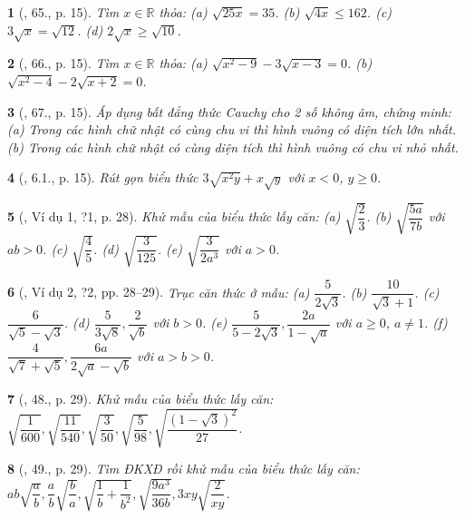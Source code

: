 \documentclass{article}
\newtheorem{baitoan}{}
\begin{document}
\begin{baitoan}[\cite{SBT_Toan_9_tap_1}, 65., p. 15]
	Tìm $x\in\mathbb{R}$ thỏa: (a) $\sqrt{25x} = 35$. (b) $\sqrt{4x}\le162$. (c) $3\sqrt{x} = \sqrt{12}$. (d) $2\sqrt{x}\ge\sqrt{10}$.
\end{baitoan}

\begin{baitoan}[\cite{SBT_Toan_9_tap_1}, 66., p. 15]
	Tìm $x\in\mathbb{R}$ thỏa: (a) $\sqrt{x^2 - 9} - 3\sqrt{x - 3} = 0$. (b) $\sqrt{x^2 - 4} - 2\sqrt{x + 2} = 0$.
\end{baitoan}

\begin{baitoan}[\cite{SBT_Toan_9_tap_1}, 67., p. 15]
	Áp dụng bất đẳng thức Cauchy cho 2 số không âm, chứng minh: (a) Trong các hình chữ nhật có cùng chu vi thì hình vuông có diện tích lớn nhất. (b) Trong các hình chữ nhật có cùng diện tích thì hình vuông có chu vi nhỏ nhất.
\end{baitoan}

\begin{baitoan}[\cite{SBT_Toan_9_tap_1}, 6.1., p. 15]
	Rút gọn biểu thức $3\sqrt{x^2y} + x\sqrt{y}$ với $x < 0$, $y\ge0$.
\end{baitoan}

\begin{baitoan}[\cite{SGK_Toan_9_tap_1}, Ví dụ 1, ?1, p. 28]
	Khử mẫu của biểu thức lấy căn: (a) $\sqrt{\dfrac{2}{3}}$. (b) $\sqrt{\dfrac{5a}{7b}}$ với $ab > 0$. (c) $\sqrt{\dfrac{4}{5}}$. (d) $\sqrt{\dfrac{3}{125}}$. (e) $\sqrt{\dfrac{3}{2a^3}}$ với $a > 0$.
\end{baitoan}

\begin{baitoan}[\cite{SGK_Toan_9_tap_1}, Ví dụ 2, ?2, pp. 28--29]
	Trục căn thức ở mẫu: (a) $\dfrac{5}{2\sqrt{3}}$. (b) $\dfrac{10}{\sqrt{3} + 1}$. (c) $\dfrac{6}{\sqrt{5} - \sqrt{3}}$. (d) $\dfrac{5}{3\sqrt{8}},\dfrac{2}{\sqrt{b}}$ với $b > 0$. (e) $\dfrac{5}{5 - 2\sqrt{3}},\dfrac{2a}{1 - \sqrt{a}}$ với $a\ge0$, $a\ne1$. (f) $\dfrac{4}{\sqrt{7} + \sqrt{5}},\dfrac{6a}{2\sqrt{a} - \sqrt{b}}$ với $a > b > 0$.
\end{baitoan}

\begin{baitoan}[\cite{SGK_Toan_9_tap_1}, 48., p. 29]
	Khử mẫu của biểu thức lấy căn: $\sqrt{\dfrac{1}{600}},\sqrt{\dfrac{11}{540}},\sqrt{\dfrac{3}{50}},\sqrt{\dfrac{5}{98}},\sqrt{\dfrac{(1 - \sqrt{3})^2}{27}}$.
\end{baitoan}

\begin{baitoan}[\cite{SGK_Toan_9_tap_1}, 49., p. 29]
	Tìm ĐKXĐ rồi khử mẫu của biểu thức lấy căn: $ab\sqrt{\dfrac{a}{b}},\dfrac{a}{b}\sqrt{\dfrac{b}{a}},\sqrt{\dfrac{1}{b} + \dfrac{1}{b^2}},\sqrt{\dfrac{9a^3}{36b}},3xy\sqrt{\dfrac{2}{xy}}$.
\end{baitoan}
\end{document}
